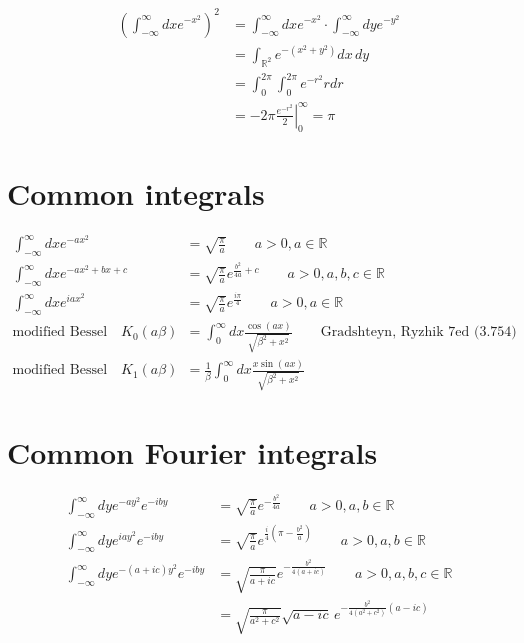 \documentclass[../main.tex]{subfiles}
\begin{document}
\begin{align}
    \left(\int_{-\infty}^\infty dx e^{-x^2}\right)^2
    &=\int_{-\infty}^\infty dx e^{-x^2} \cdot \int_{-\infty}^\infty dy e^{-y^2}\\
    &=\int_{\mathbb{R}^2}e^{-(x^2+y^2)}dx\,dy\\
    &=\int_0^{2\pi}\int_0^{2\pi}e^{-r^2}r dr \\
    &=-2\pi\left.\frac{e^{-r^2}}{2}\right|^\infty_0=\pi
\end{align}

\section{Common integrals}
\begin{align}
    \int_{-\infty}^\infty dx e^{-ax^2}&=\sqrt{\frac{\pi}{a}} \qquad a>0, a\in\mathbb{R}\\
    \int_{-\infty}^\infty dx e^{-ax^2+bx+c}&=\sqrt{\frac{\pi}{a}}e^{\frac{b^2}{4a}+c} \qquad a>0, a,b,c\in\mathbb{R}\\
    \int_{-\infty}^\infty dx e^{iax^2}&=\sqrt{\frac{\pi}{a}}e^{\frac{i\pi}{4}} \qquad a>0, a\in\mathbb{R}\\
%    
\text{modified Bessel}\quad K_0(a\beta)&=\int_0^\infty dx \frac{\cos(ax)}{\sqrt{\beta^2+x^2}} \qquad \text{Gradshteyn, Ryzhik 7ed (3.754)}\\
\text{modified Bessel}\quad K_1(a\beta)&=\frac{1}{\beta}\int_0^\infty dx \frac{x\sin(ax)}{\sqrt{\beta^2+x^2}}
\end{align}



\section{Common Fourier integrals}
\begin{align}
    \int_{-\infty}^\infty dy e^{-ay^2}e^{-iby}&=\sqrt{\frac{\pi}{a}}e^{-\frac{b^2}{4a}} \qquad a>0, a,b\in\mathbb{R}\\
    \int_{-\infty}^\infty dy e^{iay^2}e^{-iby}&=\sqrt{\frac{\pi}{a}}e^{\frac{i}{4}\left(\pi-\frac{b^2}{a}\right)} \qquad a>0, a,b\in\mathbb{R}\\
    \int_{-\infty}^\infty dy e^{-(a+ic)y^2}e^{-iby}&=\sqrt{\frac{\pi}{a+ic}}e^{-\frac{b^2}{4(a+ic)}} \qquad a>0, a,b,c\in\mathbb{R}\\
    &=\sqrt{\frac{\pi}{a^2+c^2}}\sqrt{a-ic}\,e^{-\frac{b^2}{4(a^2+c^2)}(a-ic)}
\end{align}
\end{document}

